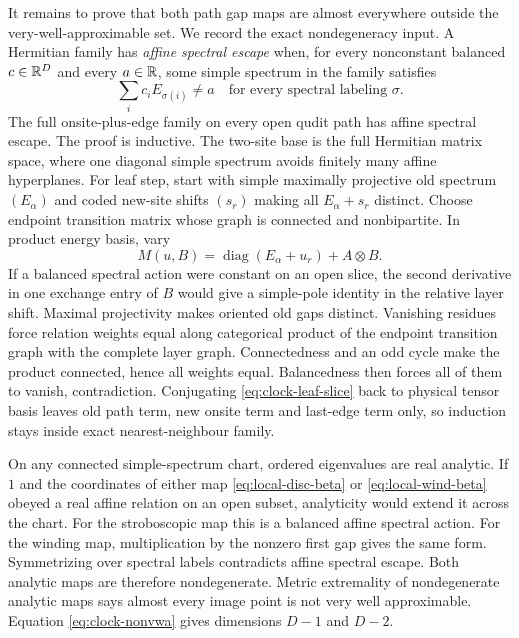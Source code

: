 It remains to prove that both path gap maps are almost everywhere outside
the very-well-approximable set.  We record the exact nondegeneracy input.  A Hermitian
family has \emph{affine spectral escape} when, for every nonconstant balanced
$c\in\mathbb R^D$ and every $a\in\mathbb R$, some simple spectrum in the family satisfies
\[
 \sum_i c_iE_{\sigma(i)}\ne a
 \quad\text{for every spectral labeling }\sigma.
\]
The full onsite-plus-edge family on every open qudit path has affine spectral
escape.  The proof is inductive.  The two-site base is the full Hermitian matrix space,
where one diagonal simple spectrum avoids finitely many affine hyperplanes.
For leaf step, start with simple maximally projective old spectrum
$(E_\alpha)$ and coded new-site shifts $(s_r)$ making all
$E_\alpha+s_r$ distinct.  Choose endpoint transition matrix whose graph is
connected and nonbipartite.  In product energy basis, vary
\begin{equation}
 M(u,B)=\operatorname{diag}(E_\alpha+u_r)+A\otimes B. \label{eq:clock-leaf-slice}
\end{equation}
If a balanced spectral action were constant on an open slice, the second derivative
in one exchange entry of $B$ would give a simple-pole identity in the relative
layer shift.  Maximal projectivity makes oriented old gaps distinct.
Vanishing residues force relation weights equal along categorical product
of the endpoint transition graph with the complete layer graph.  Connectedness and
an odd cycle make the product connected, hence all weights equal.  Balancedness
then forces all of them to vanish, contradiction.  Conjugating
\eqref{eq:clock-leaf-slice} back to physical tensor basis leaves old path
term, new onsite term and last-edge term only, so induction stays inside exact
nearest-neighbour family.

On any connected simple-spectrum chart, ordered eigenvalues are real
analytic.  If $1$ and the coordinates of either map
\eqref{eq:local-disc-beta} or \eqref{eq:local-wind-beta} obeyed a real affine
relation on an open subset, analyticity would extend it across the chart.  For
the stroboscopic map this is a balanced affine spectral action.  For the winding map,
multiplication by the nonzero first gap gives the same form.  Symmetrizing over
spectral labels contradicts affine spectral escape.  Both analytic maps are
therefore nondegenerate.  Metric extremality of nondegenerate analytic maps
\cite{KleinbockMargulis1998} says almost every image point is not very well
approximable.  Equation \eqref{eq:clock-nonvwa} gives dimensions $D-1$ and
$D-2$.

